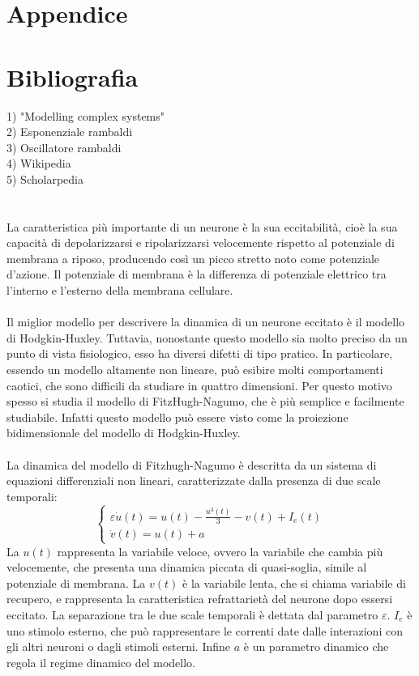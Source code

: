 \documentclass[12pt]{article}
\begin{document}
\section{Appendice}
\section{Bibliografia}
1) "Modelling complex systems" \\
2) Esponenziale rambaldi \\
3) Oscillatore rambaldi \\
4) Wikipedia \\
5) Scholarpedia \\ \\ \\
La caratteristica più importante di un neurone è la sua eccitabilità, cioè la sua capacità di depolarizzarsi e ripolarizzarsi velocemente rispetto al potenziale di membrana a riposo, producendo così un picco stretto noto come potenziale d'azione. Il potenziale di membrana è la differenza di potenziale elettrico tra l'interno e l'esterno della membrana cellulare. \\ \\
Il miglior modello per descrivere la dinamica di un neurone eccitato è il modello di Hodgkin-Huxley. Tuttavia, nonostante questo modello sia molto preciso da un punto di vista fisiologico, esso ha diversi difetti di tipo pratico. In particolare, essendo un modello altamente non lineare, può esibire molti comportamenti caotici, che sono difficili da studiare in quattro dimensioni. Per questo motivo spesso si studia il modello di FitzHugh-Nagumo, che è più semplice e facilmente studiabile. Infatti questo modello può essere visto come la proiezione bidimensionale del modello di Hodgkin-Huxley. \\ \\
La dinamica del modello di Fitzhugh-Nagumo è descritta da un sistema di equazioni differenziali non lineari, caratterizzate dalla presenza di due scale temporali:
\begin{equation}
	\begin{cases}
		\varepsilon\dot{u}(t) = u(t) - \frac{u^3(t)}{3}-v(t)+I_{e}(t) \\
		\dot{v}(t) = u(t) + a
	\end{cases}
\end{equation}
La $u(t)$ rappresenta la variabile veloce, ovvero la variabile che cambia più velocemente, che presenta una dinamica piccata di quasi-soglia, simile al potenziale di membrana. La $v(t)$ è la variabile lenta, che si chiama variabile di recupero, e rappresenta la caratteristica refrattarietà del neurone dopo essersi eccitato. La separazione tra le due scale temporali è dettata dal parametro $\varepsilon$. $I_e$ è uno stimolo esterno, che può rappresentare le correnti date dalle interazioni con gli altri neuroni o dagli stimoli esterni. Infine $a$ è un parametro dinamico che regola il regime dinamico del modello. \\ \\
\end{document}
